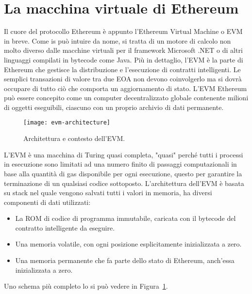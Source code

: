 \section{La macchina virtuale di Ethereum}
Il cuore del protocollo Ethereum è appunto l'Ethereum Virtual Machine o EVM in breve. Come is può intuire da nome, si tratta di un motore di calcolo non molto diverso dalle macchine virtuali per il framework Microsoft .NET o di altri linguaggi compilati in bytecode come Java. Più in dettaglio, l'EVM è la parte di Ethereum che gestisce la distribuzione e l'esecuzione di contratti intelligenti. Le semplici transazioni di valore tra due EOA non devono coinvolgerlo ma si dovrà occupare di tutto ciò che comporta un aggiornamento di stato. L'EVM Ethereum può essere concepito come un computer decentralizzato globale contenente milioni di oggetti eseguibili, ciascuno con un proprio archivio di dati permanente. 
%
\begin{figure}
	\centering 
	\texttt{[image: evm-architecture]} 
	\caption[Architettura dell'EVM]{Architettura e contesto dell'EVM.}
	\label{fig:evm-architecture} 
\end{figure}
%
L'EVM è una macchina di Turing quasi completa, "quasi" perché tutti i processi in esecuzione sono limitati ad una numero finito di passaggi computazionali in base alla quantità di gas disponibile per ogni esecuzione, questo per garantire la terminazione di un qualsiasi codice sottoposto. L'architettura dell'EVM è basata su stack nel quale vengono salvati tutti i valori in memoria, ha diversi componenti di dati utilizzati:
\begin{itemize}
	\item La ROM di codice di programma immutabile, caricata con il bytecode del contratto intelligente da eseguire.
	\item Una memoria volatile, con ogni posizione esplicitamente inizializzata a zero.
	\item Una memoria permanente che fa parte dello stato di Ethereum, anch'essa inizializzata a zero.
\end{itemize}
Uno schema più completo lo si può vedere in Figura~\ref{fig:evm-architecture}.


